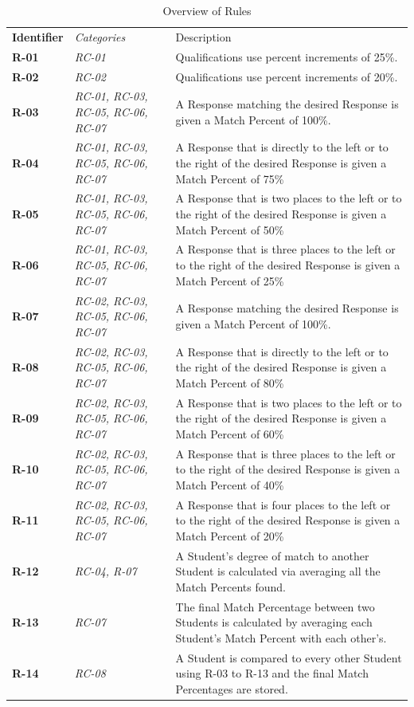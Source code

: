 \documentclass[12pt,letterpaper]{article}
\begin{document}
\begin{table}[H]
	\caption{Overview of Rules}
	\begin{tabu} to 
	    \tableheader{}Identifier & Categories & Description\\
		R-01 & RC-01 & Qualifications use percent increments of 25\%.\\
		R-02 & RC-02 & Qualifications use percent increments of 20\%.\\
		R-03 & RC-01, RC-03, RC-05, RC-06, RC-07 & A Response matching the desired Response is given a Match Percent of 100\%.\\
		R-04 & RC-01, RC-03, RC-05, RC-06, RC-07 & A Response that is directly to the left or to the right of the desired Response is given a Match Percent of 75\%\\
		R-05 & RC-01, RC-03, RC-05, RC-06, RC-07 & A Response that is two places to the left or to the right of the desired Response is given a Match Percent of 50\%\\
		R-06 & RC-01, RC-03, RC-05, RC-06, RC-07 & A Response that is three places to the left or to the right of the desired Response is given a Match Percent of 25\%\\
		R-07 & RC-02, RC-03, RC-05, RC-06, RC-07 & A Response matching the desired Response is given a Match Percent of 100\%.\\
		R-08 & RC-02, RC-03, RC-05, RC-06, RC-07 & A Response that is directly to the left or to the right of the desired Response is given a Match Percent of 80\%\\
		R-09 & RC-02, RC-03, RC-05, RC-06, RC-07 & A Response that is two places to the left or to the right of the desired Response is given a Match Percent of 60\%\\
		R-10 & RC-02, RC-03, RC-05, RC-06, RC-07 & A Response that is three places to the left or to the right of the desired Response is given a Match Percent of 40\%\\
		R-11 & RC-02, RC-03, RC-05, RC-06, RC-07 & A Response that is four places to the left or to the right of the desired Response is given a Match Percent of 20\%\\
		R-12 & RC-04, R-07 & A Student's degree of match to another Student is calculated via averaging all the Match Percents found. \\
		R-13 & RC-07 & The final Match Percentage between two Students is calculated by averaging each Student's Match Percent with each other's.\\
		R-14 & RC-08 & A Student is compared to every other Student using R-03 to R-13 and the final Match Percentages are stored.\\
		
	\end{tabu}
\end{table}
\end{document}
